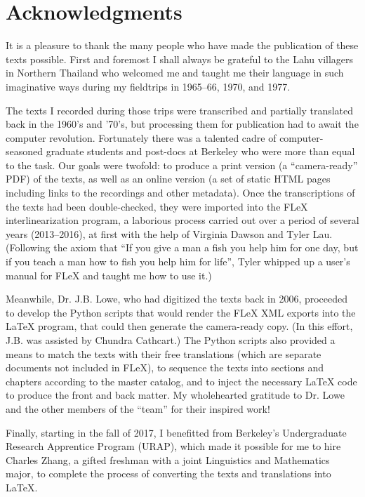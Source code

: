 \vspace{0.25em}

\renewcommand{\thefootnote}{\arabic{footnote}}
\setcounter{footnote}{0}

\chapter*{Acknowledgments}
It is a pleasure to thank the many people who have made the publication
of these texts possible. First and foremost I shall always be grateful
to the Lahu villagers in Northern Thailand who welcomed me and taught me
their language in such imaginative ways during my fieldtrips in 1965--66,
1970, and 1977.

The texts I recorded during those trips were transcribed and partially
translated back in the 1960's and '70's, but processing them for
publication had to await the computer revolution. Fortunately there
was a talented cadre of computer-seasoned graduate students and
post-docs at Berkeley who were more than equal to the task. Our goals
were twofold: to produce a print version (a ``camera-ready'' PDF) of
the texts, as well as an online version (a set of static HTML pages
including links to the recordings and other metadata). Once the
transcriptions of the texts had been double-checked, they were
imported into the FLeX interlinearization program, a laborious process
carried out over a period of several years (2013--2016), at first with
the help of Virginia Dawson and Tyler Lau.  (Following the axiom that
``If you give a man a fish you help him for one day, but if you teach
a man how to fish you help him for life'', Tyler whipped up a user's
manual for FLeX and taught me how to use it.)

Meanwhile, Dr. J.B. Lowe, who had digitized the texts back in 2006,
proceeded to develop the Python scripts that would render the FLeX XML
exports into the LaTeX program, that could then generate the
camera-ready copy. (In this effort, J.B. was assisted by Chundra
Cathcart.) The Python scripts also provided a means to match the texts
with their free translations (which are separate documents not included
in FLeX), to sequence the texts into sections and chapters according to
the master catalog, and to inject the necessary LaTeX code to produce
the front and back matter. My wholehearted gratitude to Dr. Lowe and the
other members of the ``team'' for their inspired work!

Finally, starting in the fall of 2017, I benefitted from Berkeley's
Undergraduate Research Apprentice Program (URAP), which made it possible
for me to hire Charles Zhang, a gifted freshman with a joint Linguistics
and Mathematics major, to complete the process of converting the
texts and translations into LaTeX.

